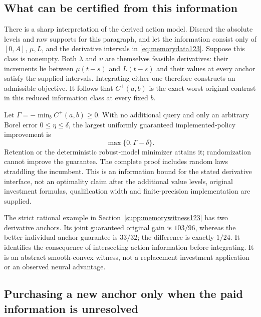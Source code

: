 \subsection{What can be certified from this information}

There is a sharp interpretation of the derived action model. Discard the
absolute levels and raw supports for this paragraph, and let the
information consist only of $[0,A]$, $\mu,L$, and the derivative
intervals in \eqref{eq:memorydata123}. Suppose this class is nonempty.
Both $\lambda$ and $\upsilon$ are themselves feasible derivatives:
their increments lie between $\mu(t-s)$ and $L(t-s)$ and their values
at every anchor satisfy the supplied intervals. Integrating either
one therefore constructs an admissible objective. It follows that
$C^+(a,b)$ is the exact worst original contrast in this reduced
information class at every fixed $b$.

Let $\Gamma=-\min_b C^+(a,b)\ge0$. With no additional query and only
an arbitrary Borel error $0\le\eta\le\delta$, the largest uniformly
guaranteed implemented-policy improvement is
\begin{equation}\label{eq:memoryminimax123}
                         \max\{0,\Gamma-\delta\}.
\end{equation}
Retention or the deterministic robust-model minimizer attains it;
randomization cannot improve the guarantee. The complete proof includes
random laws straddling the incumbent. This is an information bound for
the stated derivative interface, not an optimality claim after the
additional value levels, original investment formulas, qualification
width and finite-precision implementation are supplied.

The strict rational example in Section~\ref{supp:memorywitness123}
has two derivative anchors. Its joint guaranteed original gain is
$103/96$, whereas the better individual-anchor guarantee is $33/32$;
the difference is exactly $1/24$. It identifies the consequence of
intersecting action information before integrating. It is an abstract
smooth-convex witness, not a replacement investment application or an
observed neural advantage.

\subsection{Purchasing a new anchor only when the paid information is unresolved}
\label{sec:memoryprobe123}

